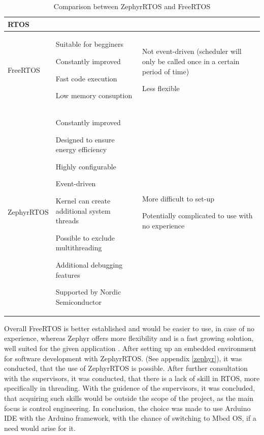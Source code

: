 \begin{table}[H]
      \makegapedcells
      \setlength{\tabcolsep}{3pt}
  \begin{tabularx}{\linewidth}{|>{\RaggedRight}p{25mm}|*{2}{I |}}
      \hline
  RTOS
      &       &           \\
      \hline
  FreeRTOS 
      &   \item Suitable for begginers
          \item Constantly improved
          \item Fast code execution
          \item Low memory consuption
          &   \item Not event-driven (scheduler will only be called once in a certain period of time)
              \item Less flexible
              \\
      \hline
  ZephyrRTOS
      &   \item Constantly improved
          \item Designed to ensure energy efficiency
          \item Highly configurable
          \item Event-driven
          \item Kernel can create additional system threads
          \item Possible to exclude multithreading
          \item Additional debugging features
          \item Supported by Nordic Semiconductor
          &   \item More difficult to set-up
              \item Potentially complicated to use with no experience
              \\
      \hline

\end{tabularx}
\caption{Comparison between ZephyrRTOS and FreeRTOS}
\label{table.rtos}
\end{table}

Overall FreeRTOS is better established and would be easier to use, in case of no experience, whereas Zephyr offers more flexibility and is a fast growing solution, well suited for the given application \cite{Industry}.
After setting up an embedded environment for software development with ZephyrRTOS. (See appendix \ref{zephyr}), it was conducted, that the use of ZephyrRTOS is possible.
After further consultation with the supervisors, it was conducted, that there is a lack of skill in RTOS, more specifically in threading. With the guidence of the supervisors, it was concluded, that acquiring such skills would be outside the scope of the project, as the main focus is control engineering.
In conclusion, the choice was made to use Arduino IDE with the Arduino framework, with the chance of switching to Mbed OS, if a need would arise for it.